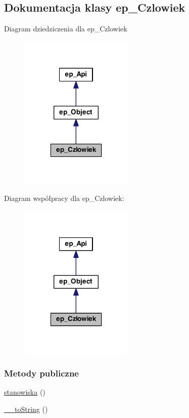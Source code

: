 \hypertarget{classep___czlowiek}{\subsection{Dokumentacja klasy ep\-\_\-\-Czlowiek}
\label{classep___czlowiek}
}


Diagram dziedziczenia dla ep\-\_\-\-Czlowiek\nopagebreak
\begin{figure}[H]
\begin{center}
\leavevmode
\includegraphics[width=154pt]{classep___czlowiek__inherit__graph}
\end{center}
\end{figure}


Diagram współpracy dla ep\-\_\-\-Czlowiek\-:\nopagebreak
\begin{figure}[H]
\begin{center}
\leavevmode
\includegraphics[width=154pt]{classep___czlowiek__coll__graph}
\end{center}
\end{figure}
\subsubsection*{Metody publiczne}
\begin{DoxyCompactItemize}
\item 
\hyperlink{classep___czlowiek_a9dd4480bf7002df382ab888d880131c2}{stanowiska} ()
\item 
\hyperlink{classep___czlowiek_a7516ca30af0db3cdbf9a7739b48ce91d}{\-\_\-\-\_\-to\-String} ()
\end{DoxyCompactItemize}
